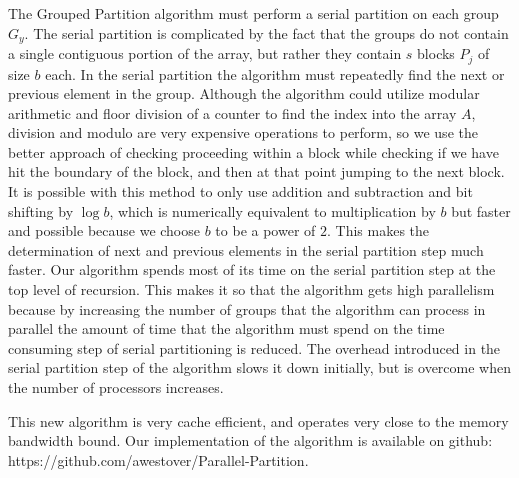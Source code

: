 \documentclass[twocolumn, twoside, 12pt]{article}
\renewcommand{\paragraph}[1]{\vspace{0.09in}\noindent{\bf \boldmath #1.}}
\begin{document}
\paragraph{Optimizations}
The Grouped Partition algorithm must perform a serial partition on each group $G_y$.
The serial partition is complicated by the fact that the groups do not contain a single contiguous portion of the array, but rather they contain $s$ blocks $P_j$ of size $b$ each.
In the serial partition the algorithm must repeatedly find the next or previous element in the group.
Although the algorithm could utilize modular arithmetic and floor division of a counter to find the index into the array $A$, division and modulo are very expensive operations to perform, so we use the better approach of checking proceeding within a block while checking if we have hit the boundary of the block, and then at that point jumping to the next block.
It is possible with this method to only use addition and subtraction and bit shifting by $\log b$, which is numerically equivalent to multiplication by $b$ but faster and possible because we choose $b$ to be a power of $2$.
This makes the determination of next and previous elements in the serial partition step much faster.
Our algorithm spends most of its time on the serial partition step at the top level of recursion.
This makes it so that the algorithm gets high parallelism because by increasing the number of groups that the algorithm can process in parallel the amount of time that the algorithm must spend on the time consuming step of serial partitioning is reduced.
The overhead introduced in the serial partition step of the algorithm slows it down initially, but is overcome when the number of processors increases.

\paragraph{Performance}
This new algorithm is very cache efficient, and operates very close to the memory bandwidth bound. Our implementation of the algorithm is available on github: https://github.com/awestover/Parallel-Partition.  
\end{document}
